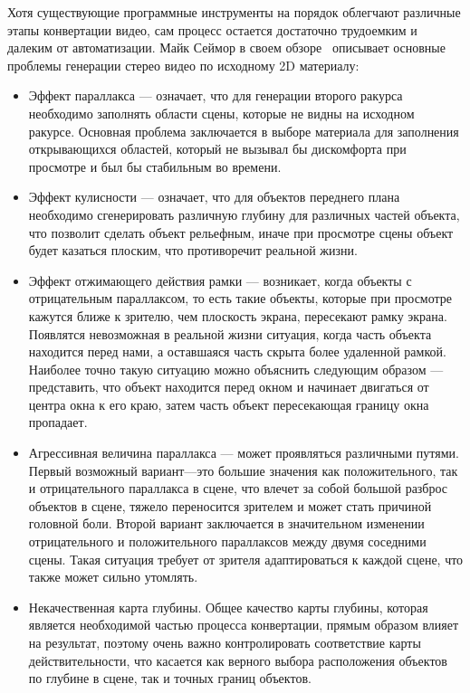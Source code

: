 \documentclass[12pt, a4paper]{article}
\begin{document}
Хотя существующие программные инструменты на порядок облегчают различные 
этапы конвертации видео, сам процесс остается достаточно трудоемким и 
далеким от автоматизации. Майк Сеймор в своем обзоре~\cite{seymour2012art} 
описывает основные проблемы генерации стерео видео по исходному 2D материалу:
\begin{itemize}
	\item Эффект параллакса --- означает, что для генерации второго ракурса 
	необходимо заполнять области сцены, которые не видны на исходном ракурсе. 
	Основная проблема заключается в выборе материала для заполнения открывающихся 
	областей, который не вызывал бы дискомфорта при просмотре и был бы стабильным во времени.
	\item Эффект кулисности --- означает, что для объектов переднего плана необходимо 
	сгенерировать различную глубину для различных частей объекта, что позволит сделать 
	объект рельефным, иначе при просмотре сцены объект будет казаться плоским, 
	что противоречит реальной жизни.
	\item Эффект отжимающего действия рамки --- возникает, когда объекты с отрицательным 
	параллаксом, то есть такие объекты, которые при просмотре кажутся ближе к зрителю, 
	чем плоскость экрана, пересекают рамку экрана. Появлятся невозможная в реальной 
	жизни ситуация, когда часть объекта находится перед нами, а оставшаяся часть скрыта 
	более удаленной рамкой. Наиболее точно такую ситуацию можно объяснить следующим 
	образом --- представить, что объект находится перед окном и начинает двигаться 
	от центра окна к его краю, затем часть объект пересекающая границу окна пропадает.
	\item Агрессивная величина параллакса --- может проявляться различными путями. 
	Первый возможный вариант---это большие значения как положительного, так и 
	отрицательного параллакса в сцене, что влечет за собой большой разброс объектов 
	в сцене, тяжело переносится зрителем и может стать причиной головной боли. 
	Второй вариант заключается в значительном изменении отрицательного и положительного 
	параллаксов между двумя соседними сцены. Такая ситуация требует от зрителя 
	адаптироваться к каждой сцене, что также может сильно утомлять.
	\item Некачественная карта глубины. Общее качество карты глубины, которая является 
	необходимой частью процесса конвертации, прямым образом влияет на результат, 
	поэтому очень важно контролировать соответствие карты действительности, 
	что касается как верного выбора расположения объектов по глубине в сцене, 
	так и точных границ объектов.
\end{itemize}
\end{document}
